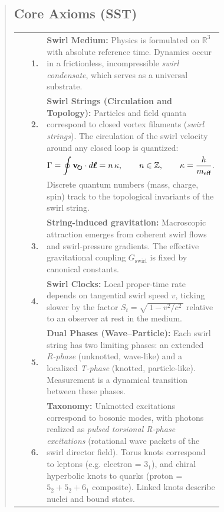 \documentclass[10pt,reprint,aps,onecolumn,nofootinbib]{revtex4-2}
\begin{document}
\begin{abstract}
    \subsection*{Core Axioms (SST)}
        \begin{tabular}{r@{\quad}p{0.75\linewidth}}
            \textbf{1.} & \textbf{Swirl Medium:} Physics is formulated on $\mathbb{R}^3$ with absolute reference time. Dynamics occur in a frictionless, incompressible \emph{swirl condensate}, which serves as a universal substrate. \\
            \textbf{2.} & \textbf{Swirl Strings (Circulation and Topology):} Particles and field quanta correspond to closed vortex filaments (\emph{swirl strings}). The circulation of the swirl velocity around any closed loop is quantized: \\
            & $\displaystyle \Gamma = \oint \mathbf{v}_{\mkern-2mu\scriptstyle\boldsymbol{\circlearrowright}} \cdot d\boldsymbol{\ell} = n\,\kappa,\qquad n\in\mathbb{Z},\qquad \kappa = \frac{h}{m_{\text{eff}}}.$ \\
            & Discrete quantum numbers (mass, charge, spin) track to the topological invariants of the swirl string. \\
            \textbf{3.} & \textbf{String-induced gravitation:} Macroscopic attraction emerges from coherent swirl flows and swirl-pressure gradients. The effective gravitational coupling $G_{\text{swirl}}$ is fixed by canonical constants. \\
            \textbf{4.} & \textbf{Swirl Clocks:} Local proper-time rate depends on tangential swirl speed $v$, ticking slower by the factor $S_t=\sqrt{\,1-v^2/c^2\,}$ relative to an observer at rest in the medium. \\
            \textbf{5.} & \textbf{Dual Phases (Wave–Particle):} Each swirl string has two limiting phases: an extended \emph{R-phase} (unknotted, wave-like) and a localized \emph{T-phase} (knotted, particle-like). Measurement is a dynamical transition between these phases. \\
            \textbf{6.} & \textbf{Taxonomy:} Unknotted excitations correspond to bosonic modes,
            with photons realized as \emph{pulsed torsional R-phase excitations} (rotational wave packets of the swirl director field). Torus knots correspond to leptons (e.g. electron = $3_1$), and chiral hyperbolic knots to quarks (proton = $5_2+5_2+6_1$ composite). Linked knots describe nuclei and bound states. \\

        \end{tabular}
    \end{abstract}
    \maketitle
\end{document}
